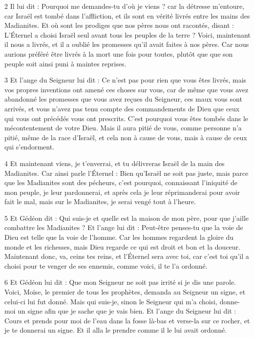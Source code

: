 \par 2 Il lui dit : Pourquoi me demandes-tu d'où je viens ? car la détresse m'entoure, car Israël est tombé dans l'affliction, et ils sont en vérité livrés entre les mains des Madianites. Et où sont les prodiges que nos pères nous ont racontés, disant : L'Éternel a choisi Israël seul avant tous les peuples de la terre ? Voici, maintenant il nous a livrés, et il a oublié les promesses qu'il avait faites à nos pères. Car nous aurions préféré être livrés à la mort une fois pour toutes, plutôt que que son peuple soit ainsi puni à maintes reprises.

\par 3 Et l'ange du Seigneur lui dit : Ce n'est pas pour rien que vous êtes livrés, mais vos propres inventions ont amené ces choses sur vous, car de même que vous avez abandonné les promesses que vous avez reçues du Seigneur, ces maux vous sont arrivés, et vous n'avez pas tenu compte des commandements de Dieu que ceux qui vous ont précédés vous ont prescrits. C’est pourquoi vous êtes tombés dans le mécontentement de votre Dieu. Mais il aura pitié de vous, comme personne n'a pitié, même de la race d'Israël, et cela non à cause de vous, mais à cause de ceux qui s'endorment.

\par 4 Et maintenant viens, je t'enverrai, et tu délivreras Israël de la main des Madianites. Car ainsi parle l'Éternel : Bien qu'Israël ne soit pas juste, mais parce que les Madianites sont des pécheurs, c'est pourquoi, connaissant l'iniquité de mon peuple, je leur pardonnerai, et après cela je leur réprimanderai pour avoir fait le mal, mais sur le Madianites, je serai vengé tout à l'heure.

\par 5 Et Gédéon dit : Qui suis-je et quelle est la maison de mon père, pour que j'aille combattre les Madianites ? Et l'ange lui dit : Peut-être penses-tu que la voie de Dieu est telle que la voie de l'homme. Car les hommes regardent la gloire du monde et les richesses, mais Dieu regarde ce qui est droit et bon et la douceur. Maintenant donc, va, ceins tes reins, et l'Éternel sera avec toi, car c'est toi qu'il a choisi pour te venger de ses ennemis, comme voici, il te l'a ordonné.

\par 6 Et Gédéon lui dit : Que mon Seigneur ne soit pas irrité si je dis une parole. Voici, Moïse, le premier de tous les prophètes, demanda au Seigneur un signe, et celui-ci lui fut donné. Mais qui suis-je, sinon le Seigneur qui m'a choisi, donne-moi un signe afin que je sache que je vais bien. Et l'ange du Seigneur lui dit : Cours et prends pour moi de l'eau dans la fosse là-bas et verse-la sur ce rocher, et je te donnerai un signe. Et il alla le prendre comme il le lui avait ordonné.

